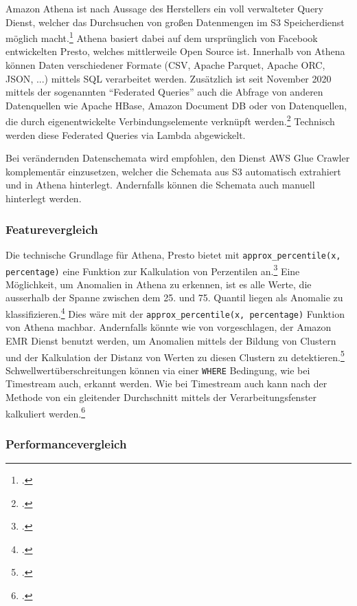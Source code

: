 Amazon Athena ist nach Aussage des Herstellers ein voll verwalteter Query Dienst, welcher das Durchsuchen von großen Datenmengen im \ac{S3} Speicherdienst möglich macht.\footcite[Vgl.][]{Barr.2016} Athena basiert dabei auf dem ursprünglich von Facebook entwickelten Presto, welches mittlerweile Open Source ist. Innerhalb von Athena können Daten verschiedener Formate (\ac{CSV}, Apache Parquet, Apache ORC, \ac{JSON}, ...) mittels \ac{SQL} verarbeitet werden. Zusätzlich ist seit November 2020 mittels der sogenannten \enquote{Federated Queries} auch die Abfrage von anderen Datenquellen wie Apache HBase, Amazon Document DB oder von Datenquellen, die durch eigenentwickelte Verbindungselemente verknüpft werden.\footcite[Vgl.][]{AmazonWebServicesInc..o.J.s} Technisch werden diese Federated Queries via Lambda abgewickelt.

Bei verändernden Datenschemata wird empfohlen, den Dienst \ac{AWS} Glue Crawler komplementär einzusetzen, welcher die Schemata aus \ac{S3} automatisch extrahiert und in Athena hinterlegt. Andernfalls können die Schemata auch manuell hinterlegt werden.

\subsubsection{Featurevergleich}
Die technische Grundlage für Athena, Presto bietet mit \texttt{approx_percentile(x, percentage)} eine Funktion zur Kalkulation von Perzentilen an.\footcite[Vgl.][]{ThePrestoFoundation.o.J.}
Eine Möglichkeit, um Anomalien in Athena zu erkennen, ist es alle Werte, die ausserhalb der Spanne zwischen dem 25. und 75. Quantil liegen als Anomalie zu klassifizieren.\footcite[Vgl.][]{Salgado.2019} Dies wäre mit der \texttt{approx_percentile(x, percentage)} Funktion von Athena machbar. Andernfalls könnte wie von \citeauthor{Megler.2016} vorgeschlagen, der Amazon \ac{EMR} Dienst benutzt werden, um Anomalien mittels der Bildung von Clustern und der Kalkulation der Distanz von Werten zu diesen Clustern zu detektieren.\footcite[Vgl.][]{Megler.2016}
Schwellwertüberschreitungen können via einer \texttt{WHERE} Bedingung, wie bei Timestream auch, erkannt werden.
Wie bei Timestream auch kann nach der Methode von \citeauthor{Ross.2020} ein gleitender Durchschnitt mittels der Verarbeitungsfenster kalkuliert werden.\footcite[Vgl.][]{Ross.2020}

\subsubsection{Performancevergleich}

